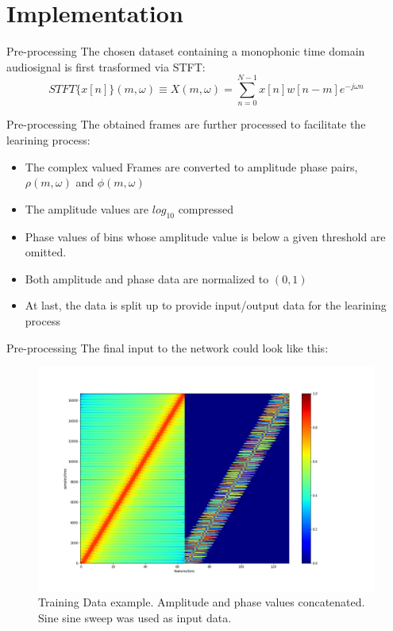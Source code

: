 \documentclass{beamer}
\begin{document}
	\section{Implementation}
	
	\begin{frame}{Pre-processing}
		The chosen dataset containing a monophonic time domain audiosignal is first trasformed via STFT:
		\begin{equation}
			{STFT} \{x[n]\}(m,\omega )\equiv X(m,\omega )=\sum _{n=0 }^{N-1 }x[n]w[n-m]e^{-j\omega n}
		\end{equation}
			

	\end{frame}

	\begin{frame}{Pre-processing}
		The obtained frames are further processed to facilitate the learining process:
		\begin{itemize}
			\item The complex valued Frames are converted to amplitude phase pairs, $\rho(m,\omega)$ and $\phi(m, \omega)$
			\item The amplitude values are $log_{10}$ compressed
			\item Phase values of bins whose amplitude value is below a given threshold are omitted.
			\item Both amplitude and phase data are normalized to $(0,1)$ 
			\item At last, the data is split up to provide input/output data for the learining process    
		\end{itemize}
	\end{frame}
		
		
	\begin{frame}{Pre-processing}
			The final input to the network could look like this:
			\begin{figure}
				\includegraphics[width=0.7\linewidth]{dataExample.png}
				\caption{Training Data example. Amplitude and phase values concatenated. Sine sine sweep was used as input data. }	
			\end{figure}
		
	\end{frame}
\end{document}
